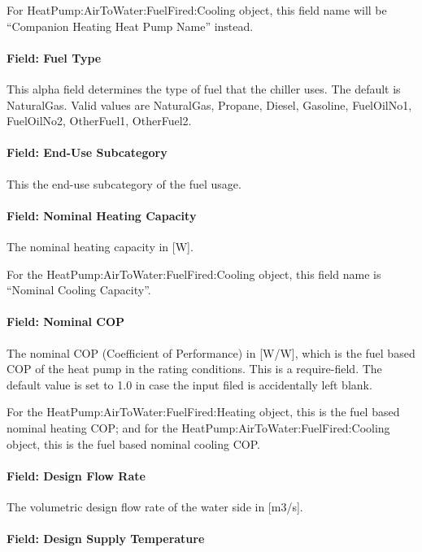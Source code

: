 For HeatPump:AirToWater:FuelFired:Cooling object, this field name will be ``Companion Heating Heat Pump Name'' instead.

\paragraph{Field: Fuel Type}

This alpha field determines the type of fuel that the chiller uses. The default is NaturalGas. Valid values are NaturalGas, Propane, Diesel, Gasoline, FuelOilNo1, FuelOilNo2, OtherFuel1, OtherFuel2.

\paragraph{Field: End-Use Subcategory}

This the end-use subcategory of the fuel usage.

\paragraph{Field: Nominal Heating Capacity}

The nominal heating capacity in [W].

For the HeatPump:AirToWater:FuelFired:Cooling object, this field name is ``Nominal Cooling Capacity''.

\paragraph{Field: Nominal COP}

The nominal COP (Coefficient of Performance) in [W/W], which is the fuel based COP of the heat pump in the rating conditions. This is a require-field. The default value is set to 1.0 in case the input filed is accidentally left blank.

For the HeatPump:AirToWater:FuelFired:Heating object, this is the fuel based nominal heating COP; and for the HeatPump:AirToWater:FuelFired:Cooling object, this is the fuel based nominal cooling COP.

\paragraph{Field: Design Flow Rate}

The volumetric design flow rate of the water side in [m3/s].

\paragraph{Field: Design Supply Temperature}

